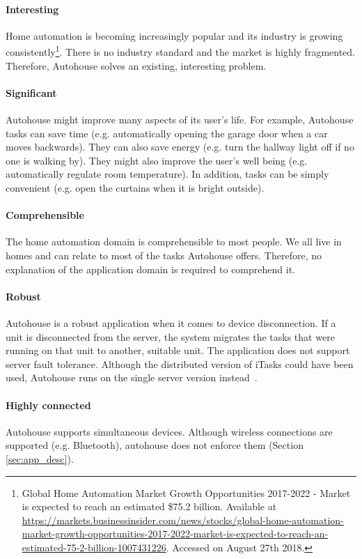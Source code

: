 \paragraph{Interesting} Home automation is becoming increasingly popular and its industry is growing consistently\footnote{Global Home Automation Market Growth Opportunities 2017-2022 - Market is expected to reach an estimated \$75.2 billion. Available at \url{https://markets.businessinsider.com/news/stocks/global-home-automation-market-growth-opportunities-2017-2022-market-is-expected-to-reach-an-estimated-75-2-billion-1007431226}. Accessed on August 27th 2018.}. There is no industry standard and the market is highly fragmented. Therefore, Autohouse solves an existing, interesting problem.

\paragraph{Significant} Autohouse might improve many aspects of its user's life. For example, Autohouse tasks can save time (e.g. automatically opening the garage door when a car moves backwards). They can also save energy (e.g. turn the hallway light off if no one is walking by). They might also improve the user's well being (e.g. automatically regulate room temperature). In addition, tasks can be simply convenient (e.g. open the curtains when it is bright outside).

\paragraph{Comprehensible} The home automation domain is comprehensible to most people. We all live in homes and can relate to most of the tasks Autohouse offers. Therefore, no explanation of the application domain is required to comprehend it. 

\paragraph{Robust} Autohouse is a robust application when it comes to device disconnection. If a unit is disconnected from the server, the system migrates the tasks that were running on that unit to another, suitable unit. The application does not support server fault tolerance. Although the distributed version of \gls{iTasks} could have been used, Autohouse runs on the single server version instead~\cite{distributed}.

\paragraph{Highly connected} Autohouse supports simultaneous devices. Although wireless connections are supported (e.g. Bluetooth), \gls{autohouse} does not enforce them (Section \ref{sec:app_desc}).

